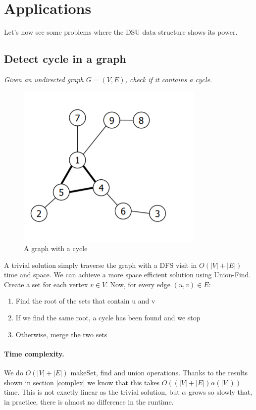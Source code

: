 \documentclass{article}
\begin{document}
\section{Applications}
Let's now see some problems where the DSU data structure shows its power.
\subsection{Detect cycle in a graph} \label{loop}
\emph{Given an undirected graph $G = (V, E)$, check if it contains a cycle.}
\begin{figure}[h!]
    \centering
    \includegraphics[scale=0.5]{img/cycle.png}
    \caption{A graph with a cycle}
\end{figure}
\bigskip

A trivial solution simply traverse the graph with a DFS visit in $O(|V| + |E|)$
time and space. We can achieve a more space efficient solution using Union-Find. Create a set for each
vertex $v \in V$. Now, for every edge $ (u,v) \in E$:\begin{enumerate}
    \item Find the root  of the sets that contain u and v
    \item If we find  the same root, a cycle has been found and we stop 
    \item Otherwise, merge the two sets
\end{enumerate}

\paragraph{Time complexity.} We do $O(|V| + |E|)$ makeSet, find and union operations.
Thanks  to the results shown in section \ref{complex} we know that this takes $O((|V| + |E|)\alpha(|V|))$ time. 
This is not exactly linear as the trivial solution, but $\alpha$ grows so slowly that, in practice, there is almost no difference in the runtime.
\end{document}
